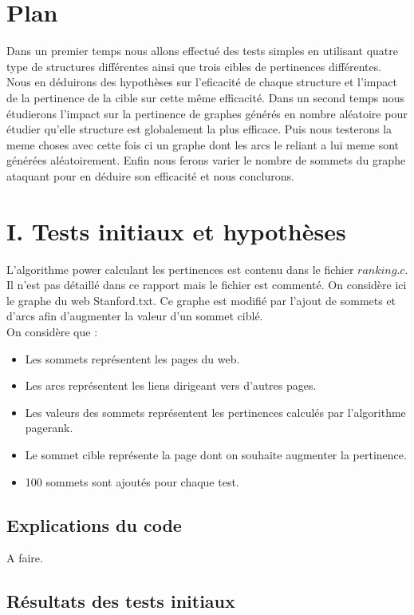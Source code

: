 \documentclass[a4paper,11pt]{article}
\begin{document}
\section{Plan}
	Dans un premier temps nous allons effectué des tests simples en utilisant quatre type de structures différentes ainsi que trois cibles de pertinences différentes.
	Nous en déduirons des hypothèses sur l'eficacité de chaque structure et l'impact de la pertinence de la cible sur cette même efficacité.
	Dans un second temps nous étudierons l'impact sur la pertinence de graphes générés en nombre aléatoire pour étudier qu'elle structure est globalement la plus efficace.
	Puis nous testerons la meme choses avec cette fois ci un graphe dont les arcs le reliant a lui meme sont générées aléatoirement.
	Enfin nous ferons varier le nombre de sommets du graphe ataquant pour en déduire son efficacité et nous conclurons.
	
\section{I.	Tests initiaux et hypothèses}
	L'algorithme power calculant les pertinences est contenu dans le fichier $ranking.c$. Il n'est pas détaillé dans ce rapport mais le fichier est commenté.
	On considère ici le graphe du web Stanford.txt. Ce graphe est modifié par l'ajout de sommets et d'arcs afin d'augmenter la valeur d'un sommet ciblé.\\
	On considère que :\\
	\begin{itemize}
		\item Les sommets représentent les pages du web.
		\item Les arcs représentent les liens dirigeant vers d'autres pages.
		\item Les valeurs des sommets représentent les pertinences calculés par l'algorithme pagerank.
		\item Le sommet cible représente la page dont on souhaite augmenter la pertinence.
		\item 100 sommets sont ajoutés pour chaque test.
	\end{itemize}
	\subsection{Explications du code}
	A faire.

	\subsection{Résultats des tests initiaux}
\end{document}
